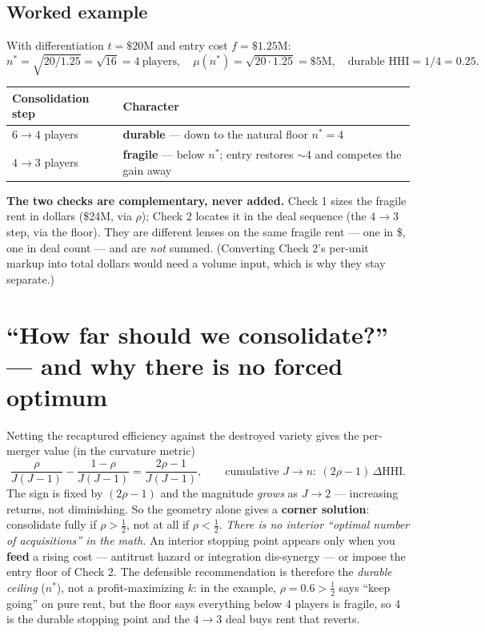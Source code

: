 \documentclass[11pt]{article}
\newcommand{\durable}{\textcolor{creoaccent}{\textbf{durable}}}
\newcommand{\fragile}{\textcolor{gray!55!black}{\textbf{fragile}}}
\begin{document}
\subsection{Worked example}
With differentiation $t=\$20\text{M}$ and entry cost $f=\$1.25\text{M}$:
\[
  n^{*}=\sqrt{20/1.25}=\sqrt{16}=4\ \text{players},\quad
  \mu(n^{*})=\sqrt{20\cdot1.25}=\$5\text{M},\quad
  \text{durable HHI}=1/4=0.25 .
\]
\begin{center}
\renewcommand{\arraystretch}{1.25}\small
\begin{tabular}{l l}
\toprule
\textbf{Consolidation step} & \textbf{Character} \\
\midrule
$6\to4$ players & \durable{} --- down to the natural floor $n^{*}=4$ \\
$4\to3$ players & \fragile{} --- below $n^{*}$; entry restores $\sim$4 and competes the gain away \\
\bottomrule
\end{tabular}
\end{center}

\begin{note}
\textbf{The two checks are complementary, never added.} Check 1 sizes the fragile rent in
dollars (\$24M, via $\rho$); Check 2 locates it in the deal sequence (the $4\to3$ step, via
the floor). They are different lenses on the same fragile rent --- one in \$, one in deal
count --- and are \emph{not} summed. (Converting Check 2's per-unit markup into total dollars
would need a volume input, which is why they stay separate.)
\end{note}

\section{``How far should we consolidate?'' --- and why there is no forced optimum}
Netting the recaptured efficiency against the destroyed variety gives the per-merger value
(in the curvature metric)
\[
  \frac{\rho}{J(J-1)}-\frac{1-\rho}{J(J-1)}=\frac{2\rho-1}{J(J-1)},
  \qquad\text{cumulative }J\to n:\ (2\rho-1)\,\Delta\text{HHI}.
\]
The sign is fixed by $(2\rho-1)$ and the magnitude \emph{grows} as $J\to2$ --- increasing
returns, not diminishing. So the geometry alone gives a \textbf{corner solution}: consolidate
fully if $\rho>\tfrac12$, not at all if $\rho<\tfrac12$. \emph{There is no interior ``optimal
number of acquisitions'' in the math.} An interior stopping point appears only when you
\textbf{feed} a rising cost --- antitrust hazard or integration dis-synergy --- or impose the
entry floor of Check 2. The defensible recommendation is therefore the \emph{durable ceiling}
($n^{*}$), not a profit-maximizing $k$: in the example, $\rho=0.6>\tfrac12$ says ``keep going''
on pure rent, but the floor says everything below 4 players is fragile, so 4 is the durable
stopping point and the $4\to3$ deal buys rent that reverts.
\end{document}
